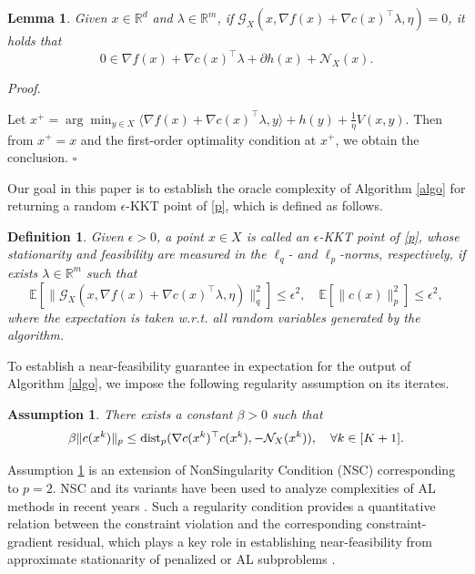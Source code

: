 \documentclass[11pt]{article}
\newtheorem{lemma}{Lemma}[section]
\newtheorem{assumption}{Assumption}[section]
\newtheorem{definition}{Definition}[section]
\newenvironment{proof}[1][Proof]{%
    \par\noindent\textit{#1.}\enspace
  }{%
    \hfill\ensuremath{\square}\par
  }%
\numberwithin{equation}{section}
\newcommand{\R}{\mathbb{R}}
\newcommand{\bee}{\begin{equation*}}
\newcommand{\eee}{\end{equation*}}
\begin{document}
\begin{lemma}
    Given $x \in \R^d$ and $\lambda \in \R^m$, if $\mathcal{G}_X (x,\nabla f(x) + \nabla c(x)^\top \lambda,\eta) = 0$, it holds that  
    \bee
        0 \in \nabla f(x) + \nabla c(x)^\top \lambda + \partial  h(x) + \mathcal{N}_X(x).
    \eee
\end{lemma}
\begin{proof}
    Let 
    \(
    x^+ = \arg \min_{y \in X} \langle \nabla f(x)+ \nabla c(x)^\top\lambda,y \rangle + h(y) + \frac{1}{\eta} V(x,y).
    \)
    Then from $x^+ = x$ and  the first-order optimality condition at $x^+$, 
    we obtain the conclusion. 
\end{proof}


Our goal in this paper is to establish the oracle complexity of Algorithm \ref{algo} for returning a random $\epsilon$-KKT point of \eqref{p}, which is defined as follows.
\begin{definition}{\label{de:kkt}}
    Given $\epsilon > 0$, a point $x\in X$ is called an
    \(\epsilon\)-KKT point of \eqref{p}, whose stationarity and feasibility are
    measured in the $\ell_q$- and $\ell_p$-norms, respectively, if exists $\lambda\in\mathbb{R}^m$ such that 
    \[
         \mathbb{E} [\|\mathcal{G}_X ( x,\nabla f(x) + \nabla c(x)^\top\lambda,\eta)\|_q^2  ] \le \epsilon^2, \quad   
        \mathbb{E} [\|c(x)\|_p^2]  \le \epsilon^2,
    \]
    where the expectation is taken w.r.t.  all random variables generated by the algorithm.
\end{definition}


To establish a near-feasibility guarantee in expectation for the output of Algorithm \ref{algo}, we impose the following regularity assumption on its iterates.  

\begin{assumption}\label{ass:ensc}
   There exists a constant $ \beta > 0 $ such that
    \[
            \beta \| c ( x^k  )   \|_p \leq  {\rm dist}_p ( {\nabla c} ( x^k )^\top c ( x^k ),  -\mathcal{N}_{X}(x^{k})  )  ,\quad \forall k \in  [ K+1  ] .
    \]
\end{assumption}

Assumption \ref{ass:ensc} is an extension of NonSingularity Condition (NSC) \cite[Assumption 4]{ippp} corresponding to \(p=2\). NSC and its variants have been used to analyze  complexities of AL methods in recent years \cite{rialm2021,li2024stochastic,ippp,sahin2019inexact}. 
Such a regularity condition provides a quantitative relation between the
constraint violation and the corresponding constraint-gradient residual,
which plays a key role in establishing near-feasibility from approximate
stationarity of penalized or AL subproblems
\cite{li2024stochastic,ippp}.
\end{document}

